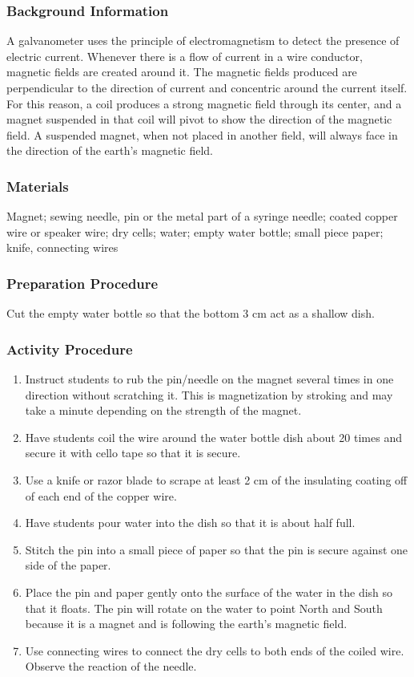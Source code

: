 \subsubsection*{Background Information}
A galvanometer uses the principle of electromagnetism to detect the presence of electric current. Whenever there is a flow of current in a wire conductor, magnetic fields are created around it. The magnetic fields produced are perpendicular to the direction of current and concentric around the current itself. For this reason, a coil produces a strong magnetic field through its center, and a magnet suspended in that coil will pivot to show the direction of the magnetic field. A suspended magnet, when not placed in another field, will always face in the direction of the earth's magnetic field.  

\subsubsection*{Materials}
Magnet; sewing needle, pin or the metal part of a syringe needle; coated copper wire or speaker wire; dry cells; water; empty water bottle; small piece paper; knife, connecting wires

\subsubsection*{Preparation Procedure}
Cut the empty water bottle so that the bottom 3 cm act as a shallow dish.

\subsubsection*{Activity Procedure}
\begin{enumerate}
\item{Instruct students to rub the pin/needle on the magnet several times in one direction without scratching it. This is magnetization by stroking and may take a minute depending on the strength of the magnet.} 
\item{Have students coil the wire around the water bottle dish about 20 times and secure it with cello tape so that it is secure.} 
\item{Use a knife or razor blade to scrape at least 2 cm of the insulating coating off of each end of the copper wire.} 
\item{Have students pour water into the dish so that it is about half full.} 
\item{Stitch the pin into a small piece of paper so that the pin is secure against one side of the paper.} 
\item{Place the pin and paper gently onto the surface of the water in the dish so that it floats. The pin will rotate on the water to point North and South because it is a magnet and is following the earth's magnetic field.} 
\item{Use connecting wires to connect the dry cells to both ends of the coiled wire. Observe the reaction of the needle.} 
\end{enumerate}

